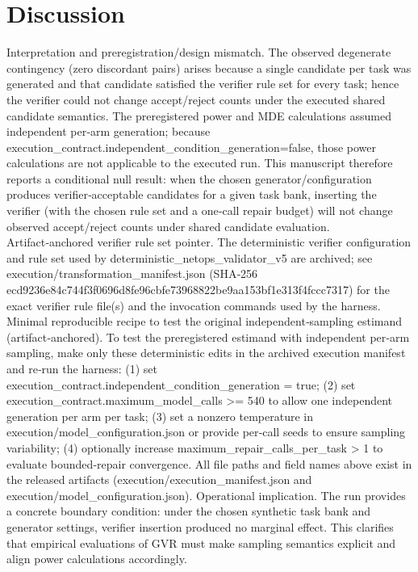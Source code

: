 \documentclass[conference]{IEEEtran}
\begin{document}
\section{Discussion}
Interpretation and preregistration/design mismatch. The observed degenerate contingency (zero discordant pairs) arises because a single candidate per task was generated and that candidate satisfied the verifier rule set for every task; hence the verifier could not change accept/reject counts under the executed shared candidate semantics. The preregistered power and MDE calculations assumed independent per‑arm generation; because execution\_contract.independent\_condition\_generation=false, those power calculations are not applicable to the executed run. This manuscript therefore reports a conditional null result: when the chosen generator/configuration produces verifier‑acceptable candidates for a given task bank, inserting the verifier (with the chosen rule set and a one‑call repair budget) will not change observed accept/reject counts under shared candidate evaluation. Artifact‑anchored verifier rule set pointer. The deterministic verifier configuration and rule set used by deterministic\_netops\_validator\_v5 are archived; see execution/transformation\_manifest.json (SHA‑256 ecd9236e84c744f3f0696d8fe96cbfe73968822be9aa153bf1e313f4fccc7317) for the exact verifier rule file(s) and the invocation commands used by the harness. Minimal reproducible recipe to test the original independent‑sampling estimand (artifact‑anchored). To test the preregistered estimand with independent per‑arm sampling, make only these deterministic edits in the archived execution manifest and re‑run the harness: (1) set execution\_contract.independent\_condition\_generation = true; (2) set execution\_contract.maximum\_model\_calls >= 540 to allow one independent generation per arm per task; (3) set a nonzero temperature in execution/model\_configuration.json or provide per‑call seeds to ensure sampling variability; (4) optionally increase maximum\_repair\_calls\_per\_task > 1 to evaluate bounded‑repair convergence. All file paths and field names above exist in the released artifacts (execution/execution\_manifest.json and execution/model\_configuration.json). Operational implication. The run provides a concrete boundary condition: under the chosen synthetic task bank and generator settings, verifier insertion produced no marginal effect. This clarifies that empirical evaluations of GVR must make sampling semantics explicit and align power calculations accordingly.
\end{document}
